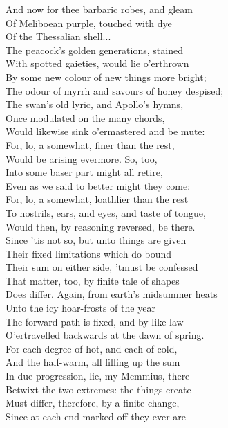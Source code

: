 And now for thee barbaric robes, and gleam\\
Of Meliboean purple, touched with dye\\
Of the Thessalian shell...\\
The peacock's golden generations, stained\\
With spotted gaieties, would lie o'erthrown\\
By some new colour of new things more bright;\\
The odour of myrrh and savours of honey despised;\\
The swan's old lyric, and Apollo's hymns,\\
Once modulated on the many chords,\\
Would likewise sink o'ermastered and be mute:\\
For, lo, a somewhat, finer than the rest,\\
Would be arising evermore. So, too,\\
Into some baser part might all retire,\\
Even as we said to better might they come:\\
For, lo, a somewhat, loathlier than the rest\\
To nostrils, ears, and eyes, and taste of tongue,\\
Would then, by reasoning reversed, be there.\\
Since 'tis not so, but unto things are given\\
Their fixed limitations which do bound\\
Their sum on either side, 'tmust be confessed\\
That matter, too, by finite tale of shapes\\
Does differ. Again, from earth's midsummer heats\\
Unto the icy hoar-frosts of the year\\
The forward path is fixed, and by like law\\
O'ertravelled backwards at the dawn of spring.\\
For each degree of hot, and each of cold,\\
And the half-warm, all filling up the sum\\
In due progression, lie, my Memmius, there\\
Betwixt the two extremes: the things create\\
Must differ, therefore, by a finite change,\\
Since at each end marked off they ever are\\
